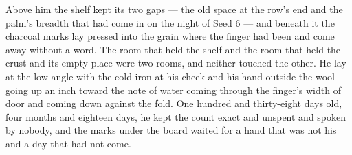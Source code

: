Above him the shelf kept its two gaps --- the old space at the row's end and the palm's breadth that had come in on the night of Seed 6 --- and beneath it the charcoal marks lay pressed into the grain where the finger had been and come away without a word. The room that held the shelf and the room that held the crust and its empty place were two rooms, and neither touched the other. He lay at the low angle with the cold iron at his cheek and his hand outside the wool going up an inch toward the note of water coming through the finger's width of door and coming down against the fold. One hundred and thirty-eight days old, four months and eighteen days, he kept the count exact and unspent and spoken by nobody, and the marks under the board waited for a hand that was not his and a day that had not come.
